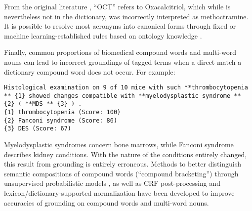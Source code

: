 \documentclass[10pt, oneside]{article}
\begin{document}
From the original literature \cite{monier199922}, ``OCT'' refers to Oxacalcitriol, which while is nevertheless not in the dictionary, was incorrectly interpreted as methoctramine. It is possible to resolve most acronyms into canonical forms through fixed or machine learning-established rules based on ontology knowledge \cite{naderi2011organismtagger}.

Finally, common proportions of biomedical compound words and multi-word nouns can lead to incorrect groundings of tagged terms when a direct match a dictionary compound word does not occur. For example:

\begin{lstlisting}[breaklines]
Histological examination on 9 of 10 mice with such **thrombocytopenia ** {1} showed changes compatible with **myelodysplastic syndrome ** {2} ( **MDS ** {3} ) . 
{1} thrombocytopenia (Score: 100)
{2} Fanconi syndrome (Score: 86)
{3} DES (Score: 67)
\end{lstlisting}

Myelodysplastic syndromes concern bone marrows, while Fanconi syndrome describes kidney conditions. With the nature of the conditions entirely changed, this result from grounding is entirely erroneous. Methods to better distinguish semantic compositions of compound words (``compound bracketing'') through unsupervised probabilistic models \cite{pecina2010lexical}, as well as CRF post-processing and lexicon/dictionary-supported normalization \cite{lee2016audis} have been developed to improve accuracies of grounding on compound words and multi-word nouns.


\small{}
\end{document}
